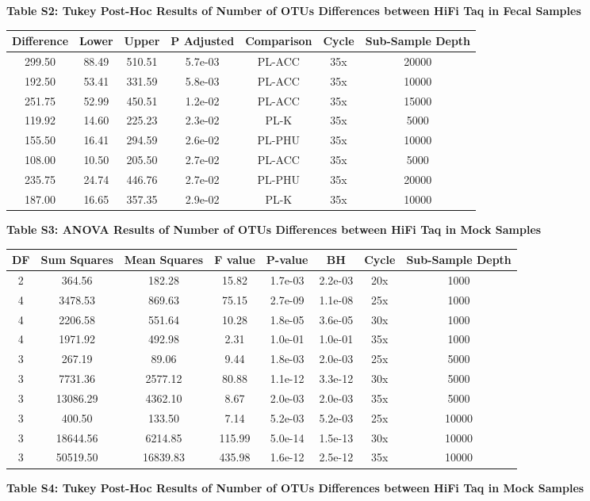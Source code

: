 \documentclass[12pt,]{article}
\begin{document}
\newpage

\textbf{Table S2: Tukey Post-Hoc Results of Number of OTUs Differences
between HiFi Taq in Fecal Samples}

\begin{longtable}[]{@{}ccccccc@{}}
\toprule
Difference & Lower & Upper & P Adjusted & Comparison & Cycle &
Sub-Sample Depth\tabularnewline
\midrule
\endhead
299.50 & 88.49 & 510.51 & 5.7e-03 & PL-ACC & 35x & 20000\tabularnewline
192.50 & 53.41 & 331.59 & 5.8e-03 & PL-ACC & 35x & 10000\tabularnewline
251.75 & 52.99 & 450.51 & 1.2e-02 & PL-ACC & 35x & 15000\tabularnewline
119.92 & 14.60 & 225.23 & 2.3e-02 & PL-K & 35x & 5000\tabularnewline
155.50 & 16.41 & 294.59 & 2.6e-02 & PL-PHU & 35x & 10000\tabularnewline
108.00 & 10.50 & 205.50 & 2.7e-02 & PL-ACC & 35x & 5000\tabularnewline
235.75 & 24.74 & 446.76 & 2.7e-02 & PL-PHU & 35x & 20000\tabularnewline
187.00 & 16.65 & 357.35 & 2.9e-02 & PL-K & 35x & 10000\tabularnewline
\bottomrule
\end{longtable}

\newpage

\textbf{Table S3: ANOVA Results of Number of OTUs Differences between
HiFi Taq in Mock Samples}

\begin{longtable}[]{@{}cccccccc@{}}
\toprule
DF & Sum Squares & Mean Squares & F value & P-value & BH & Cycle &
Sub-Sample Depth\tabularnewline
\midrule
\endhead
2 & 364.56 & 182.28 & 15.82 & 1.7e-03 & 2.2e-03 & 20x &
1000\tabularnewline
4 & 3478.53 & 869.63 & 75.15 & 2.7e-09 & 1.1e-08 & 25x &
1000\tabularnewline
4 & 2206.58 & 551.64 & 10.28 & 1.8e-05 & 3.6e-05 & 30x &
1000\tabularnewline
4 & 1971.92 & 492.98 & 2.31 & 1.0e-01 & 1.0e-01 & 35x &
1000\tabularnewline
3 & 267.19 & 89.06 & 9.44 & 1.8e-03 & 2.0e-03 & 25x &
5000\tabularnewline
3 & 7731.36 & 2577.12 & 80.88 & 1.1e-12 & 3.3e-12 & 30x &
5000\tabularnewline
3 & 13086.29 & 4362.10 & 8.67 & 2.0e-03 & 2.0e-03 & 35x &
5000\tabularnewline
3 & 400.50 & 133.50 & 7.14 & 5.2e-03 & 5.2e-03 & 25x &
10000\tabularnewline
3 & 18644.56 & 6214.85 & 115.99 & 5.0e-14 & 1.5e-13 & 30x &
10000\tabularnewline
3 & 50519.50 & 16839.83 & 435.98 & 1.6e-12 & 2.5e-12 & 35x &
10000\tabularnewline
\bottomrule
\end{longtable}

\newpage

\textbf{Table S4: Tukey Post-Hoc Results of Number of OTUs Differences
between HiFi Taq in Mock Samples}
\end{document}
